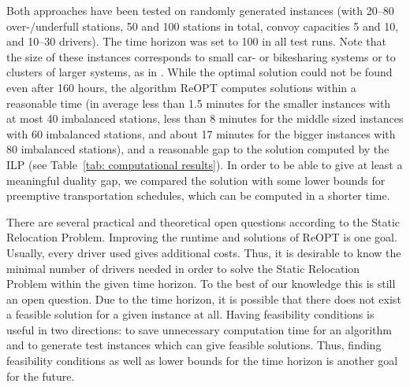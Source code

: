 \documentclass[english]{llncs}
\numberwithin{sublemma}{lemma}
\begin{document}
Both approaches have been tested on randomly generated instances (with 20--80 over-/underfull stations, 50 and 100 stations in total, convoy capacities 5 and 10, and 10--30 drivers). 
The time horizon was set to 100 in all test runs.
Note that the size of these instances corresponds to small car- or bikesharing systems or to clusters of larger systems, as in \cite{SHH-2013}.
While the optimal solution could not be found even after 160 hours, the algorithm
ReOPT computes solutions within a reasonable time (in average less than 1.5 minutes for the smaller instances with at most 40 imbalanced stations,
less than 8 minutes for the middle sized instances with 60 imbalanced stations,
and about 17 minutes for the bigger instances with 80 imbalanced stations), and a reasonable gap to the solution computed by the ILP (see Table~\ref{tab: computational results}).
In order to be able to give at least a meaningful duality gap, we compared the solution with some lower bounds for preemptive transportation schedules, which can be computed in a shorter time.



There are several practical and theoretical open questions according to the Static Relocation Problem.
Improving the runtime and solutions of ReOPT is one goal.
Usually, every driver used gives additional costs.
Thus, it is desirable to know the minimal number of drivers needed in order to solve the Static Relocation Problem within the given time horizon.
To the best of our knowledge this is still an open question.
Due to the time horizon, it is possible that there does not exist a feasible solution for a given instance at all.
Having feasibility conditions is useful in two directions: to save unnecessary computation time for an algorithm and to generate test instances which can give feasible solutions.
Thus, finding feasibility conditions as well as lower bounds for the time horizon is another goal for the future.







\end{document}
